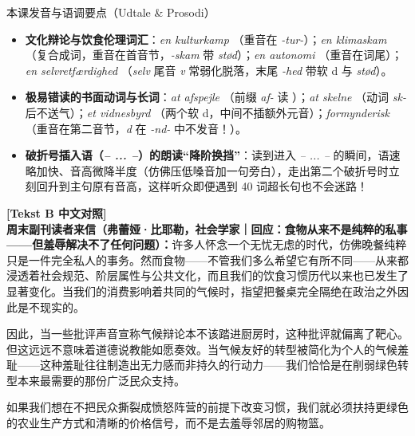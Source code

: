 \begin{tipbox}{本课发音与语调要点（Udtale \& Prosodi）}
\begin{itemize}
  \item \textbf{文化辩论与饮食伦理词汇}：\textit{en kulturkamp} （重音在 \textit{-tur-}）；\textit{en klimaskam} （复合成词，重音在首音节，\textit{-skam} 带 \textit{stød}）；\textit{en autonomi} （重音在词尾）；\textit{en selvretfærdighed} （\textit{selv} 尾音 \textit{v} 常弱化脱落，末尾 \textit{-hed} 带软 d 与 \textit{stød}）。
  \item \textbf{极易错读的书面动词与长词}：\textit{at afspejle} （前缀 \textit{af-} 读 ）；\textit{at skelne} （动词 \textit{sk-} 后不送气）；\textit{et vidnesbyrd} （两个软 d，中间不插额外元音）；\textit{formynderisk} （重音在第二音节，\textit{d} 在 \textit{-nd-} 中不发音！）。
  \item \textbf{破折号插入语（\textit{-- ... --}）的朗读“降阶换挡”}：读到进入 \textit{-- ... --} 的瞬间，语速略加快、音高微降半度（仿佛压低嗓音加一句旁白），走出第二个破折号时立刻回升到主句原有音高，这样听众即便遇到 40 词超长句也不会迷路！
\end{itemize}
\end{tipbox}

\begin{transbox}
\small
\textbf{\color{NCDTeal}[Tekst B 中文对照]}\\
\textbf{周末副刊读者来信（弗蕾娅·比耶勒，社会学家｜回应：食物从来不是纯粹的私事——但羞辱解决不了任何问题）：}许多人怀念一个无忧无虑的时代，仿佛晚餐纯粹只是一件完全私人的事务。然而食物——不管我们多么希望它有所不同——从来都浸透着社会规范、阶层属性与公共文化，而且我们的饮食习惯历代以来也已发生了显著变化。当我们的消费影响着共同的气候时，指望把餐桌完全隔绝在政治之外因此是不现实的。

因此，当一些批评声音宣称气候辩论本不该踏进厨房时，这种批评就偏离了靶心。但这远远不意味着道德说教能如愿奏效。当气候友好的转型被简化为个人的气候羞耻——这种羞耻往往制造出无力感而非持久的行动力——我们恰恰是在削弱绿色转型本来最需要的那份广泛民众支持。

如果我们想在不把民众撕裂成愤怒阵营的前提下改变习惯，我们就必须扶持更绿色的农业生产方式和清晰的价格信号，而不是去羞辱邻居的购物篮。
\end{transbox}


